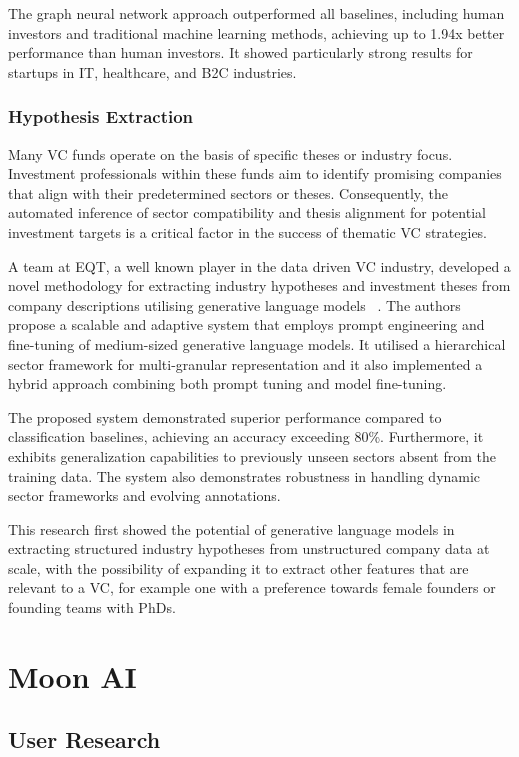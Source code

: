 \documentclass[a4paper, oneside]{discothesis}
\begin{document}
The graph neural network approach outperformed all baselines, including human investors and traditional machine learning methods, achieving up to 1.94x better performance than human investors. It showed particularly strong results for startups in IT, healthcare, and B2C industries.

\subsection{Hypothesis Extraction}

Many VC funds operate on the basis of specific theses or industry focus. Investment professionals within these funds aim to identify promising companies that align with their predetermined sectors or theses. Consequently, the automated inference of sector compatibility and thesis alignment for potential investment targets is a critical factor in the success of thematic VC strategies.


A team at EQT, a well known player in the data driven VC industry, developed a novel methodology for extracting industry hypotheses and investment theses from company descriptions utilising generative language models ~\cite{lele_cao_infer_industry_sector}. The authors propose a scalable and adaptive system that employs prompt engineering and fine-tuning of medium-sized generative language models. It utilised a hierarchical sector framework for multi-granular representation and it also implemented a hybrid approach combining both prompt tuning and model fine-tuning.

The proposed system demonstrated superior performance compared to classification baselines, achieving an accuracy exceeding 80\%. Furthermore, it exhibits generalization capabilities to previously unseen sectors absent from the training data. The system also demonstrates robustness in handling dynamic sector frameworks and evolving annotations.

This research first showed the potential of generative language models in extracting structured industry hypotheses from unstructured company data at scale, with the possibility of expanding it to extract other features that are relevant to a VC, for example one with a preference towards female founders or founding teams with PhDs. 

\chapter{Moon AI}
\section{User Research}
\end{document}
